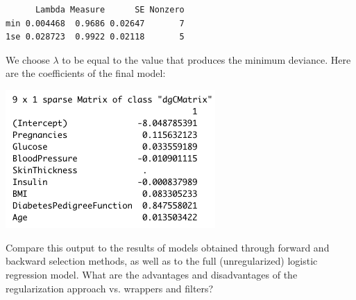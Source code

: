 \begin{question}{}
\begin{center}
{\begin{verbatim}
      Lambda Measure      SE Nonzero
min 0.004468  0.9686 0.02647       7
1se 0.028723  0.9922 0.02118       5
\end{verbatim}
}
\end{center}
We choose $\lambda$ to be equal to the value that produces the minimum deviance. Here are the coefficients of the final model:
\begin{center}
\includegraphics[width=0.6\textwidth]{img/pima-glmnet-output.png}
\end{center}
Compare this output to the results of models obtained through forward and backward selection methods, as well as to the full (unregularized) logistic regression model. What are the advantages and disadvantages of the regularization approach vs. wrappers and filters?
\end{question}


